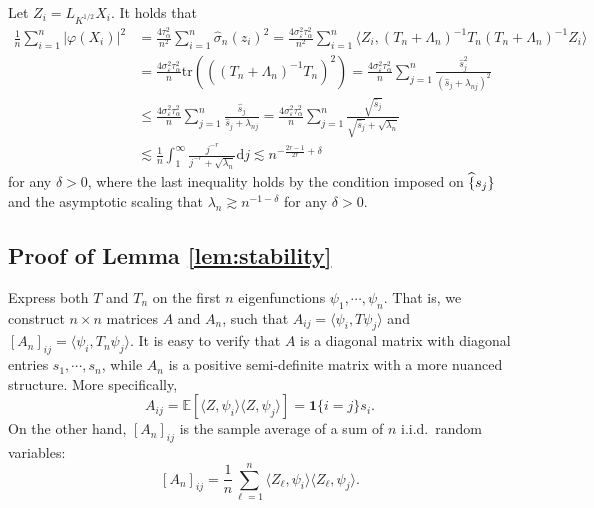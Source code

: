 \documentclass[11pt,a4paper]{article}
\renewcommand{\hat}{\widehat}
\newcommand{\vct}{\boldsymbol}
\newcommand{\tr}{\mathrm{tr}}
\theoremstyle{definition}
\theoremstyle{plain}
\theoremstyle{remark}
\newcommand{\ud}{\mathrm d}
\begin{document}
Let $Z_i=L_{K^{1/2}}X_i$.
It holds that
\begin{align*}
\frac{1}{n}\sum_{i=1}^n\big|\varphi(X_i)\big|^2 &= \frac{4\tau_\alpha^2}{n^2}\sum_{i=1}^n\hat\sigma_n(z_i)^2 = \frac{4\sigma_\varepsilon^2\tau_\alpha^2}{n^2}\sum_{i=1}^n \langle Z_i, (T_n+\Lambda_n)^{-1}T_n(T_n+\Lambda_n)^{-1}Z_i\rangle\\
&= \frac{4\sigma_\varepsilon^2\tau_\alpha^2}{n}\tr(((T_n+\Lambda_n)^{-1}T_n)^2) = \frac{4\sigma_\varepsilon^2\tau_\alpha^2}{n}\sum_{j=1}^n\frac{\hat s_j^2}{(\hat s_j+\lambda_{nj})^2}\\
&\leq \frac{4\sigma_\varepsilon^2\tau_\alpha^2}{n}\sum_{j=1}^n\frac{\hat s_j}{\hat s_j+\lambda_{nj}} = \frac{4\sigma_\varepsilon^2\tau_\alpha^2}{n}\sum_{j=1}^n\frac{\sqrt{\hat s_j}}{\sqrt{\hat s_j}+\sqrt{\lambda_{n}}}\\
&\lesssim \frac{1}{n}\int_1^{\infty} \frac{j^{-r}}{j^{-r}+\sqrt{\lambda_n}}\ud j \lesssim n^{-\frac{2r-1}{2r}+\delta}
\end{align*}
for any $\delta>0$, where the last inequality holds by the condition imposed on $\hat\{s_j\}$ and the asymptotic scaling that $\lambda_n\gtrsim n^{-1-\delta}$ for any $\delta>0$.


\subsection{Proof of Lemma \ref{lem:stability}}

Express both $T$ and $T_n$ on the first $n$ eigenfunctions $\psi_1,\cdots,\psi_n$. That is, we construct $n\times n$ matrices $A$ and $A_n$, such that 
$A_{ij}=\langle\psi_i, T\psi_j\rangle$ and $[A_n]_{ij}=\langle\psi_i, T_n\psi_j\rangle$.
It is easy to verify that $A$ is a diagonal matrix with diagonal entries $s_1,\cdots,s_n$, while $A_n$ is a positive semi-definite matrix with a more nuanced structure.
More specifically,
$$
A_{ij} = \mathbb E[\langle Z,\psi_i\rangle\langle Z,\psi_j\rangle] = \vct 1\{i=j\}s_i.
$$
On the other hand, $[A_n]_{ij}$ is the sample average of a sum of $n$ i.i.d.~random variables:
$$
[A_n]_{ij} = \frac{1}{n}\sum_{\ell=1}^n \langle Z_\ell,\psi_i\rangle\langle Z_\ell,\psi_j\rangle.
$$

\end{document}
